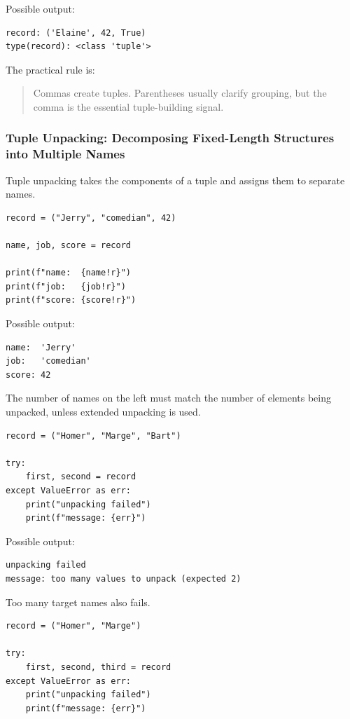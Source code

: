 Possible output:

\begin{verbatim}
record: ('Elaine', 42, True)
type(record): <class 'tuple'>
\end{verbatim}

The practical rule is:

\begin{quote}
Commas create tuples. Parentheses usually clarify grouping, but the comma is the essential tuple-building signal.
\end{quote}

\subsubsection{Tuple Unpacking: Decomposing Fixed-Length Structures into Multiple Names}

Tuple unpacking takes the components of a tuple and assigns them to separate names.

\begin{verbatim}
record = ("Jerry", "comedian", 42)

name, job, score = record

print(f"name:  {name!r}")
print(f"job:   {job!r}")
print(f"score: {score!r}")
\end{verbatim}

Possible output:

\begin{verbatim}
name:  'Jerry'
job:   'comedian'
score: 42
\end{verbatim}

The number of names on the left must match the number of elements being unpacked, unless extended unpacking is used.

\begin{verbatim}
record = ("Homer", "Marge", "Bart")

try:
    first, second = record
except ValueError as err:
    print("unpacking failed")
    print(f"message: {err}")
\end{verbatim}

Possible output:

\begin{verbatim}
unpacking failed
message: too many values to unpack (expected 2)
\end{verbatim}

Too many target names also fails.

\begin{verbatim}
record = ("Homer", "Marge")

try:
    first, second, third = record
except ValueError as err:
    print("unpacking failed")
    print(f"message: {err}")
\end{verbatim}

